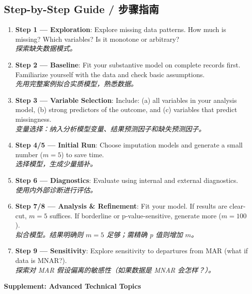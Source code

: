 \documentclass[9pt, a4paper]{article}
\begin{document}
\subsection{Step-by-Step Guide / 步骤指南}
\begin{enumerate}
    \item \textbf{Step 1 --- Exploration}: Explore missing data patterns. How much is missing? Which variables? Is it monotone or arbitrary?\\
    \textit{探索缺失数据模式。}
    \item \textbf{Step 2 --- Baseline}: Fit your substantive model on complete records first. Familiarize yourself with the data and check basic assumptions.\\
    \textit{先用完整案例拟合实质模型，熟悉数据。}
    \item \textbf{Step 3 --- Variable Selection}: Include: (a) all variables in your analysis model, (b) strong predictors of the outcome, and (c) variables that predict missingness.\\
    \textit{变量选择：纳入分析模型变量、结果预测因子和缺失预测因子。}
    \item \textbf{Step 4/5 --- Initial Run}: Choose imputation models and generate a small number ($m = 5$) to save time.\\
    \textit{选择模型，生成少量插补。}
    \item \textbf{Step 6 --- Diagnostics}: Evaluate using internal and external diagnostics.\\
    \textit{使用内外部诊断进行评估。}
    \item \textbf{Step 7/8 --- Analysis \& Refinement}: Fit your model. If results are clear-cut, $m = 5$ suffices. If borderline or p-value-sensitive, generate more ($m = 100$).\\
    \textit{拟合模型。结果明确则 $m=5$ 足够；需精确 p 值则增加 $m$。}
    \item \textbf{Step 9 --- Sensitivity}: Explore sensitivity to departures from MAR (what if data is MNAR?).\\
    \textit{探索对 MAR 假设偏离的敏感性（如果数据是 MNAR 会怎样？）。}
\end{enumerate}

\begin{center}
    \Large \textbf{Supplement: Advanced Technical Topics}
\end{center}
\end{document}
